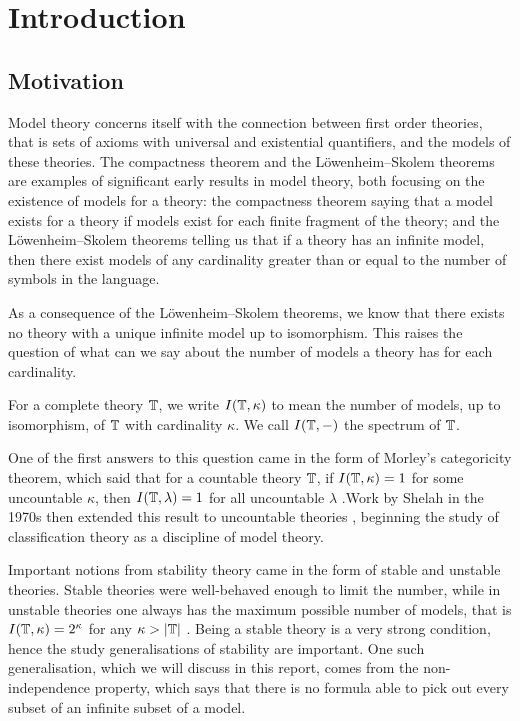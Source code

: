 \section{Introduction}%
\label{sec:introduction}

\subsection{Motivation}%
\label{sub:motivation}

Model theory concerns itself with the connection between first order theories, that is
sets of axioms with universal and existential quantifiers, and the models of these
theories. The compactness theorem and the Löwenheim–Skolem theorems are examples of
significant early results in model theory, both focusing on the existence of models for a
theory: the compactness theorem saying that a model exists for a theory if models
exist for each finite fragment of the theory; and the Löwenheim–Skolem theorems telling
us that if a theory has an infinite model, then there exist models of any cardinality
greater than or equal to the number of symbols in the language.

As a consequence of the Löwenheim–Skolem theorems, we know that there exists no theory
with a unique infinite model up to isomorphism. This raises the question of what can
we say about the number of models a theory has for each cardinality.

\begin{defn}
  For a complete theory $\mathbb{T}$, we write $I(\mathbb{T}, \kappa)$ to mean the number of
  models, up to isomorphism, of $\mathbb{T}$ with cardinality $\kappa$. We call
  $I(\mathbb{T}, -)$ the spectrum of $\mathbb{T}$.
\end{defn}

One of the first answers to this question came in the form of Morley's categoricity
theorem, which said that for a countable theory $\mathbb{T}$, if $I(\mathbb{T},\kappa) = 1$ for
some uncountable $\kappa$, then $I(\mathbb{T},\lambda) = 1$ for all uncountable $\lambda$
\cite{10.2307/1994188}.Work by Shelah in the 1970s then extended this result to uncountable theories
\cite{Sh:31}, beginning the study of classification theory as a discipline of model theory.

Important notions from stability theory came in the form of stable and unstable theories.
Stable theories were well-behaved enough to limit the number, while in unstable theories
one always has the maximum possible number of models, that is
$I(\mathbb{T},\kappa) = 2^\kappa$ for any $\kappa > |\mathbb{T}|$ \cite{Sh:a}. Being a stable theory
is a very strong condition, hence the study generalisations of stability are important.
One such generalisation, which we will discuss in this report, comes from the
non-independence property, which says that there is no formula able to pick out every
subset of an infinite subset of a model.

